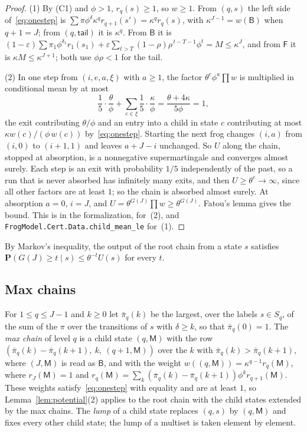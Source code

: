 \documentclass[11pt]{amsart}
\theoremstyle{definition}
\numberwithin{equation}{section}
\renewcommand{\P}{\mathbf{P}}
\newcommand{\eps}{\varepsilon}
\begin{document}
\begin{proof}
(1) By (C1) and $\phi>1$, $r_q(s)\ge1$, so $w\ge1$. From $(q,s)$ the left side of~\eqref{eq:onestep} is $\sum\pi\phi^\delta\kappa^{q}r_{q+1}(s')=\kappa^{q}r_q(s)$, with $\kappa^{J-1}=w(\mathsf B)$ when $q+1=J$; from $(q,\mathsf{tail})$ it is $\kappa^{q}$. From $\mathsf B$ it is $(1-\eps)\sum\pi_1\phi^{\delta_1}r_1(s_1)+\eps\sum_{t>T}(1-\rho)\rho^{\,t-T-1}\phi^t=M\le\kappa^J$, and from $\mathsf F$ it is $\kappa M\le\kappa^{J+1}$; both use $\phi\rho<1$ for the tail.

(2) In one step from $(i,e,a,\xi)$ with $a\ge1$, the factor $\theta^e\phi^a\prod w$ is multiplied in conditional mean by at most
\[
\frac15\cdot\frac{\theta}{\phi}+\sum_{c\in\xi}\frac15\cdot\frac{\kappa}{\phi}=\frac{\theta+4\kappa}{5\phi}=1,
\]
the exit contributing $\theta/\phi$ and an entry into a child in state $c$ contributing at most $\kappa w(c)/(\phi\,w(c))$ by~\eqref{eq:onestep}. Starting the next frog changes $(i,a)$ from $(i,0)$ to $(i+1,1)$ and leaves $a+J-i$ unchanged. So $U$ along the chain, stopped at absorption, is a nonnegative supermartingale and converges almost surely. Each step is an exit with probability $1/5$ independently of the past, so a run that is never absorbed has infinitely many exits, and then $U\ge\theta^e\to\infty$, since all other factors are at least $1$; so the chain is absorbed almost surely. At absorption $a=0$, $i=J$, and $U=\theta^{G(J)}\prod w\ge\theta^{G(J)}$. Fatou's lemma gives the bound. This is  in the formalization, for~(2), and \texttt{FrogModel.Cert.Data.child\_mean\_le} for~(1).
\end{proof}

By Markov's inequality, the output of the root chain from a state $s$ satisfies $\P(G(J)\ge t\mid s)\le\theta^{-t}U(s)$ for every $t$.

\subsection{Max chains}
For $1\le q\le J-1$ and $k\ge0$ let $\bar\pi_q(k)$ be the largest, over the labels $s\in S_q$, of the sum of the $\pi$ over the transitions of $s$ with $\delta\ge k$, so that $\bar\pi_q(0)=1$. The \emph{max chain} of level $q$ is a child state $(q,\mathsf M)$ with the row $(\bar\pi_q(k)-\bar\pi_q(k+1),\ k,\ (q+1,\mathsf M))$ over the $k$ with $\bar\pi_q(k)>\bar\pi_q(k+1)$, where $(J,\mathsf M)$ is read as $\mathsf B$, and with the weight $w((q,\mathsf M))=\kappa^{q-1}r_q(\mathsf M)$, where $r_J(\mathsf M)=1$ and $r_q(\mathsf M)=\sum_k(\bar\pi_q(k)-\bar\pi_q(k+1))\phi^kr_{q+1}(\mathsf M)$. These weights satisfy~\eqref{eq:onestep} with equality and are at least $1$, so Lemma~\ref{lem:potential}(2) applies to the root chain with the child states extended by the max chains. The \emph{lump} of a child state replaces $(q,s)$ by $(q,\mathsf M)$ and fixes every other child state; the lump of a multiset is taken element by element.
\end{document}
